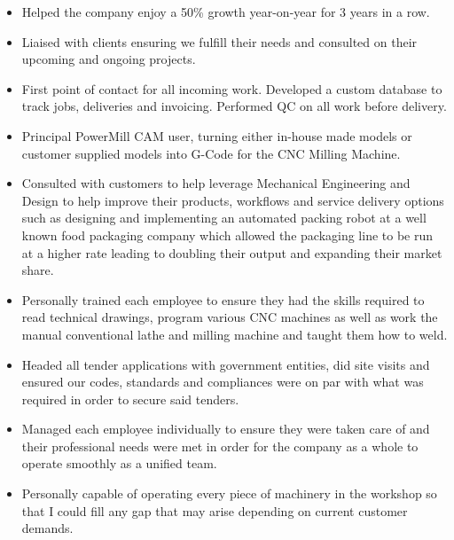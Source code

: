 \documentclass[10pt,a4paper]{altacv}
\begin{document}
\begin{paracol}{2}
\newpage

\begin{itemize}
    \item Helped the company enjoy a 50\% growth year-on-year for 3 years in a row.
    \item Liaised with clients ensuring we fulfill their needs and consulted on their upcoming and ongoing projects.
    \item First point of contact for all incoming work. Developed a custom database to track jobs, deliveries and invoicing. Performed QC on all work before delivery.
    \item Principal PowerMill CAM user, turning either in-house made models or customer supplied models into G-Code for the CNC Milling Machine.
    \item Consulted with customers to help leverage Mechanical Engineering and Design to help improve their products, workflows and service delivery options such as designing and implementing an automated packing robot at a well known food packaging company which allowed the packaging line to be run at a higher rate leading to doubling their output and expanding their market share.
    \item Personally trained each employee to ensure they had the skills required to read technical drawings, program various CNC machines as well as work the manual conventional lathe and milling machine and taught them how to weld.
    \item Headed all tender applications with government entities, did site visits and ensured our codes, standards and compliances were on par with what was required in order to secure said tenders.
    \item Managed each employee individually to ensure they were taken care of and their professional needs were met in order for the company as a whole to operate smoothly as a unified team.
    \item Personally capable of operating every piece of machinery in the workshop so that I could fill any gap that may arise depending on current customer demands.
\end{itemize}

\divider


\end{paracol}
\end{document}
